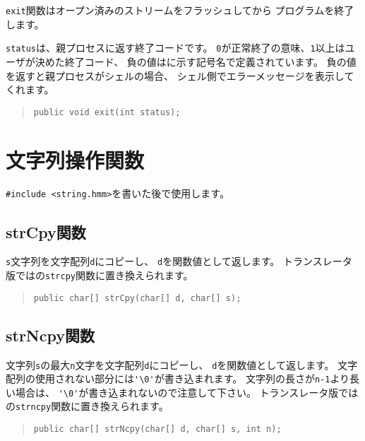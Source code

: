 \verb/exit/関数はオープン済みのストリームをフラッシュしてから
プログラムを終了します。

\verb/status/は、親プロセスに返す終了コードです。
\verb/0/が正常終了の意味、\verb/1/以上はユーザが決めた終了コード、
負の値はに示す記号名で定義されています。
負の値を返すと親プロセスがシェルの場合、
シェル側でエラーメッセージを表示してくれます。

\begin{quote}
\begin{verbatim}
public void exit(int status);
\end{verbatim}
\end{quote}

\section{文字列操作関数}

\verb/#include <string.hmm>/を書いた後で使用します。

\subsection{strCpy関数}

\verb/s/文字列を文字配列\verb/d/にコピーし、
\verb/d/を関数値として返します。
トランスレータ版では\cl の\verb/strcpy/関数に置き換えられます。

\begin{quote}
\begin{verbatim}
public char[] strCpy(char[] d, char[] s);
\end{verbatim}
\end{quote}

\subsection{strNcpy関数}

文字列\verb/s/の最大\verb/n/文字を文字配列\verb/d/にコピーし、
\verb/d/を関数値として返します。
文字配列の使用されない部分には\verb/'\0'/が書き込まれます。
文字列の長さが\verb/n-1/より長い場合は、
\verb/'\0'/が書き込まれないので注意して下さい。
トランスレータ版では\cl の\verb/strncpy/関数に置き換えられます。

\begin{quote}
\begin{verbatim}
public char[] strNcpy(char[] d, char[] s, int n);
\end{verbatim}
\end{quote}

